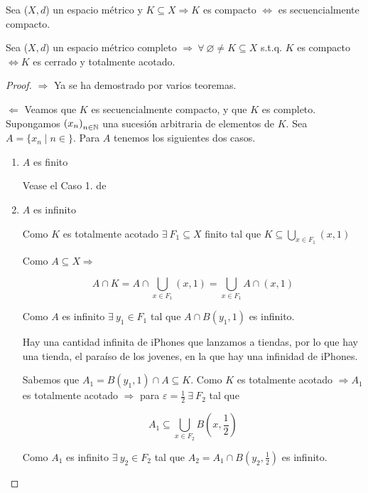 \begin{corollary}
    Sea ($X,d$) un espacio métrico y $K \subseteq X \Rightarrow K$ es compacto $\iff$ es secuencialmente compacto.
\end{corollary}

\begin{theorem} \label{theomhbr}
    Sea ($X,d$) un espacio métrico completo $\Rightarrow \: \forall \: \varnothing \neq K \subseteq X$ s.t.q. $K$ es compacto $\iff K$ es cerrado y totalmente acotado.
\end{theorem}

\begin{proof}
    $\Rightarrow$ Ya se ha demostrado por varios teoremas.

    $\Leftarrow$ Veamos que $K$ es secuencialmente compacto, y que $K$ es completo. Supongamos ${\left(x_n\right)}_{n \in \mathbb{N}}$ una sucesión arbitraria de elementos de $K$. Sea $A = \{ x_n \mid n \in \} $. Para $A$ tenemos los siguientes dos casos.

    \begin{enumerate}
        \item $A$ es finito

        Vease el Caso 1. de 
        
        \item $A$ es infinito

        Como $K$ es totalmente acotado $\exists \: F_1 \subseteq X$ finito tal que $K \subseteq \bigcup_{x \in F_1} (x, 1)$

        Como $A \subseteq X \Rightarrow$

        $$A \cap K = A \cap \bigcup_{x \in F_1} (x, 1) = \bigcup_{x \in F_1} A \cap (x, 1) $$

        Como $A$ es infinito $\exists \: y_1 \in F_1$ tal que $A \cap B(y_1, 1)$ es infinito. 
        
        Hay una cantidad infinita de iPhones que lanzamos a tiendas, por lo que hay una tienda, el paraíso de los jovenes, en la que hay una infinidad de iPhones.

        Sabemos que $A_1 = B(y_1, 1) \cap A \subseteq K$. Como $K$ es totalmente acotado $\Rightarrow A_1$ es totalmente acotado $\Rightarrow$ para $\varepsilon = \frac{1}{2} \: \exists \: F_2$ tal que

        $$A_1 \subseteq \bigcup_{x \in F_2} B\left( x, \frac{1}{2} \right)$$

        Como $A_1$ es infinito $\exists \: y_2 \in F_2$ tal que $A_2 = A_1 \cap  B\left( y_2, \frac{1}{2} \right)$ es infinito. 


\end{enumerate}
\end{proof}
